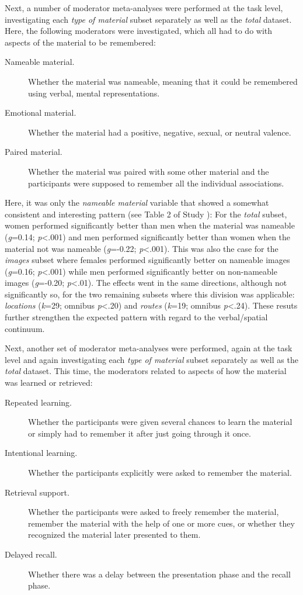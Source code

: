 Next, a number of moderator meta-analyses were performed at the task level, investigating each \emph{type of material} subset separately as well as the \emph{total} dataset. Here, the following moderators were investigated, which all had to do with aspects of the material to be remembered:

\begin{description} \item [Nameable material.] Whether the material was nameable, meaning that it could be remembered using verbal, mental representations.

\item [Emotional material.] Whether the material had a positive, negative, sexual, or neutral valence.

\item [Paired material.] Whether the material was paired with some other material and the participants were supposed to remember all the individual associations. \end{description}

Here, it was only the \emph{nameable material} variable that showed a somewhat consistent and interesting pattern (see Table 2 of Study ): For the \emph{total} subset, women performed significantly better than men when the material was nameable (\emph{g}=0.14; \emph{p}<.001) and men performed significantly better than women when the material not was nameable (\emph{g}=-0.22; \emph{p}<.001). This was also the case for the \emph{images} subset where females performed significantly better on nameable images (\emph{g}=0.16; \emph{p}<.001) while men performed significantly better on non-nameable images (\emph{g}=-0.20; \emph{p}<.01). The effects went in the same directions, although not significantly so, for the two remaining subsets where this division was applicable: \emph{locations} (\emph{k}=29; omnibus \emph{p}<.20) and \emph{routes} (\emph{k}=19; omnibus \emph{p}<.24). These resuts further strengthen the expected pattern with regard to the verbal/spatial continuum.

Next, another set of moderator meta-analyses were performed, again at the task level and again investigating each \emph{type of material} subset separately as well as the \emph{total} dataset. This time, the moderators related to aspects of how the material was learned or retrieved:

\begin{description} \item [Repeated learning.] Whether the participants were given several chances to learn the material or simply had to remember it after just going through it once. \item [Intentional learning.] Whether the participants explicitly were asked to remember the material. \item [Retrieval support.] Whether the participants were asked to freely remember the material, remember the material with the help of one or more cues, or whether they recognized the material later presented to them. \item [Delayed recall.] Whether there was a delay between the presentation phase and the recall phase. \end{description}

